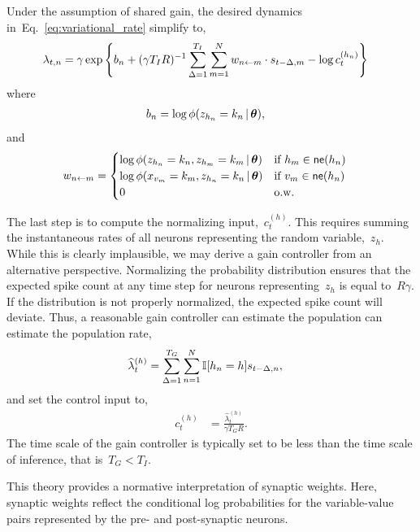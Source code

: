 Under the assumption of shared gain, the
desired dynamics in~Eq.~\ref{eq:variational_rate}
simplify to,
\begin{align}
  \label{eq:mf_log_probs}
  \lambda_{t,n} &= \gamma
  \exp \left \{b_n + (\gamma T_I R)^{-1} \sum_{\Delta=1}^{T_I} \sum_{m=1}^N w_{n \leftarrow m} \cdot s_{t-\Delta,m}
  - \log c_t^{(h_n)} \right \}
\end{align}
where
\begin{align}
  b_n &= \log \phi(z_{h_n} = k_n \,|\, \boldsymbol{\theta}),
\end{align}
and
\begin{align}
  w_{n \leftarrow m} &=
  \begin{cases}
    \log \phi(z_{h_n}=k_n, z_{h_m}=k_m \,|\, \boldsymbol{\theta}) & \text{if }h_m
    \in \mathsf{ne}(h_n) \\
    \log \phi(x_{v_m}=k_m, z_{h_n}=k_n \,|\, \boldsymbol{\theta}) & \text{if }v_m \in \mathsf{ne}(h_n) \\
    0 & \text{o.w.}
  \end{cases}
\end{align}


The last step is to compute the normalizing input,~$c_t^{(h)}$.
This requires summing the instantaneous rates of all neurons representing the
random variable,~$z_h$. While this is clearly implausible, we may derive
a gain controller from an alternative perspective. Normalizing the
probability distribution ensures that the expected spike count at
any time step for
neurons representing~$z_h$ is equal to~$R\gamma$. If the distribution
is not properly normalized, the expected spike count will deviate.
Thus, a reasonable gain controller can estimate the population
can estimate the population rate,
\begin{align}
\widehat{\lambda}_{t}^{(h)} &= \sum_{\Delta = 1}^{T_G} \sum_{n=1}^N \mathbb{I}[h_n=h] s_{t-\Delta, n},
\end{align}
and set the control input to,
\begin{align}
  c_{t}^{(h)} &= \frac{\widehat{\lambda}_{t}^{(h)}}{\gamma T_G R}.
\end{align}
The time scale of the gain controller is typically set to be
less than the time scale of inference, that is~$T_G < T_I$.


This theory provides a normative interpretation of synaptic weights.
Here, synaptic weights reflect the conditional log probabilities
for the variable-value pairs represented by the pre- and post-synaptic
neurons. 


